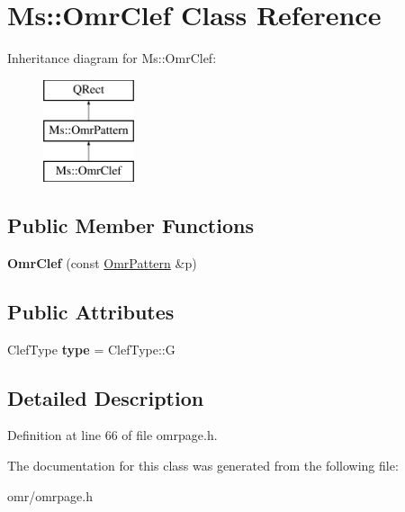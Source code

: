 \hypertarget{class_ms_1_1_omr_clef}{}\section{Ms\+:\+:Omr\+Clef Class Reference}
\label{class_ms_1_1_omr_clef}
Inheritance diagram for Ms\+:\+:Omr\+Clef\+:\begin{figure}[H]
\begin{center}
\leavevmode
\includegraphics[height=3.000000cm]{class_ms_1_1_omr_clef}
\end{center}
\end{figure}
\subsection*{Public Member Functions}
\begin{DoxyCompactItemize}
\item 
\mbox{\label{class_ms_1_1_omr_clef_add787e38c2dd91f3d0550a177f3b26e8}} 
{\bfseries Omr\+Clef} (const \hyperlink{class_ms_1_1_omr_pattern}{Omr\+Pattern} \&p)
\end{DoxyCompactItemize}
\subsection*{Public Attributes}
\begin{DoxyCompactItemize}
\item 
\mbox{\label{class_ms_1_1_omr_clef_a0202253bc73779eab715cfd2d7350877}} 
Clef\+Type {\bfseries type} = Clef\+Type\+::G
\end{DoxyCompactItemize}


\subsection{Detailed Description}


Definition at line 66 of file omrpage.\+h.



The documentation for this class was generated from the following file\+:\begin{DoxyCompactItemize}
\item 
omr/omrpage.\+h\end{DoxyCompactItemize}
